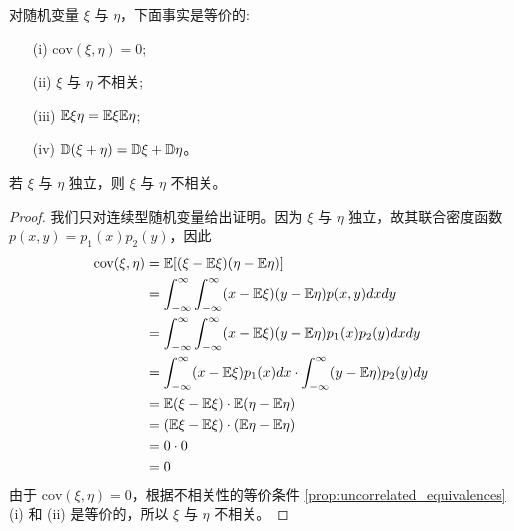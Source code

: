 \begin{proposition} \label{prop:uncorrelated_equivalences}
对随机变量 $\xi$ 与 $\eta$，下面事实是等价的:
\begin{enumerate}
\item[(i)] $\text{cov}(\xi,\eta) = 0$;
\item[(ii)] $\xi$ 与 $\eta$ 不相关;
\item[(iii)] $\mathbb{E}\xi\eta = \mathbb{E}\xi \mathbb{E}\eta$;
\item[(iv)] $\mathbb{D}(\xi+\eta) = \mathbb{D}\xi+\mathbb{D}\eta$。
\end{enumerate}
\end{proposition}
\begin{proposition} \label{prop:independence_implies_uncorrelation}
若 $\xi$ 与 $\eta$ 独立，则 $\xi$ 与 $\eta$ 不相关。
\end{proposition}

\begin{proof}
我们只对连续型随机变量给出证明。因为 $\xi$ 与 $\eta$ 独立，故其联合密度函数 $p(x,y)=p_1(x)p_2(y)$，因此
\begin{align*}
\text{cov}(\xi,\eta) &= \mathbb{E}[(\xi-\mathbb{E}\xi)(\eta-\mathbb{E}\eta)] \\
&= \int_{-\infty}^\infty \int_{-\infty}^\infty (x - \mathbb{E}\xi)(y - \mathbb{E}\eta)p(x,y) dx dy \\
&= \int_{-\infty}^\infty \int_{-\infty}^\infty (x - \mathbb{E}\xi)(y - \mathbb{E}\eta)p_1(x)p_2(y) dx dy \\
&= \int_{-\infty}^\infty (x - \mathbb{E}\xi)p_1(x) dx \cdot \int_{-\infty}^\infty (y - \mathbb{E}\eta)p_2(y) dy \\
&= \mathbb{E}(\xi-\mathbb{E}\xi) \cdot \mathbb{E}(\eta-\mathbb{E}\eta) \\
&= (\mathbb{E}\xi - \mathbb{E}\xi) \cdot (\mathbb{E}\eta - \mathbb{E}\eta) \\
&= 0 \cdot 0 \\
&= 0
\end{align*}
由于 $\text{cov}(\xi,\eta) = 0$，根据不相关性的等价条件 \ref{prop:uncorrelated_equivalences} (i) 和 (ii) 是等价的，所以 $\xi$ 与 $\eta$ 不相关。
\end{proof}

